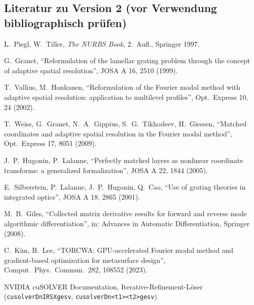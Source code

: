 \subsection*{Literatur zu Version 2 (vor Verwendung bibliographisch prüfen)}
\begin{enumerate}[label={[\arabic*]},nosep,leftmargin=2em,start=11]
  \item L.~Piegl, W.~Tiller, \emph{The NURBS Book}, 2.\ Aufl., Springer 1997.
  \item G.~Granet, \enquote{Reformulation of the lamellar grating problem through the concept of adaptive spatial resolution}, JOSA A 16, 2510 (1999).
  \item T.~Vallius, M.~Honkanen, \enquote{Reformulation of the Fourier modal method with adaptive spatial resolution: application to multilevel profiles}, Opt.\ Express 10, 24 (2002).
  \item T.~Weiss, G.~Granet, N.~A.~Gippius, S.~G.~Tikhodeev, H.~Giessen, \enquote{Matched coordinates and adaptive spatial resolution in the Fourier modal method}, Opt.\ Express 17, 8051 (2009).
  \item J.~P.~Hugonin, P.~Lalanne, \enquote{Perfectly matched layers as nonlinear coordinate transforms: a generalized formalization}, JOSA A 22, 1844 (2005).
  \item E.~Silberstein, P.~Lalanne, J.~P.~Hugonin, Q.~Cao, \enquote{Use of grating theories in integrated optics}, JOSA A 18, 2865 (2001).
  \item M.~B.~Giles, \enquote{Collected matrix derivative results for forward and reverse mode algorithmic differentiation}, in: Advances in Automatic Differentiation, Springer (2008).
  \item C.~Kim, B.~Lee, \enquote{TORCWA: GPU-accelerated Fourier modal method and gradient-based optimization for metasurface design}, Comput.\ Phys.\ Commun.\ 282, 108552 (2023).
  \item NVIDIA cuSOLVER Documentation, Iterative-Refinement-Löser (\verb|cusolverDnIRSXgesv|, \verb|cusolverDn<t1><t2>gesv|).
\end{enumerate}
